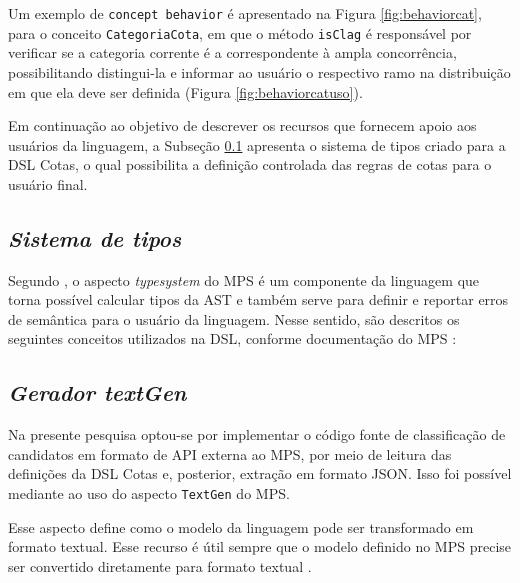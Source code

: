 \newpage
Um exemplo de \texttt{concept behavior} é apresentado na Figura \ref{fig:behaviorcat}, para o conceito \texttt{CategoriaCota}, em que o método \texttt{isClag} é responsável por verificar se a categoria corrente é a correspondente à ampla concorrência, possibilitando distingui-la e informar ao usuário o respectivo ramo na distribuição em que ela deve ser definida (Figura \ref{fig:behaviorcatuso}).





\newpage
Em continuação ao objetivo de descrever os recursos que fornecem apoio aos usuários da linguagem, a Subseção \ref{sub:sec:typesystem} apresenta o sistema de tipos criado para a DSL Cotas, o qual possibilita a definição controlada das regras de cotas para o usuário final.


\subsection{\textit{Sistema de tipos}}
\label{sub:sec:typesystem}

Segundo , o aspecto \textit{typesystem} do \gls{MPS} é um componente da linguagem que torna possível calcular tipos da \gls{AST} e também serve para definir e reportar erros de semântica para o usuário da linguagem. Nesse sentido, são descritos os seguintes conceitos utilizados na DSL, conforme documentação do \gls{MPS} :





\newpage
\subsection{\textit{Gerador textGen}}
\label{sub:sec:texgen}

Na presente pesquisa optou-se por implementar o código fonte de classificação de candidatos em formato de \gls{API} externa ao \gls{MPS}, por meio de leitura das definições da DSL Cotas e, posterior, extração em formato JSON. Isso foi possível mediante ao uso do aspecto \texttt{TextGen} do MPS.

Esse aspecto define como o modelo da linguagem pode ser transformado em formato textual. Esse recurso é útil sempre que o modelo definido no MPS precise ser convertido diretamente para formato textual \cite{jetbrains}. 

